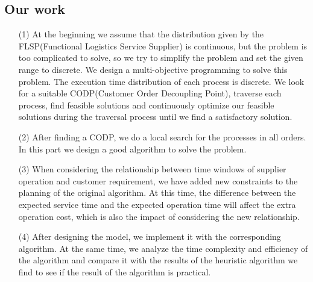 \documentclass{llncs}
\begin{document}
    \subsection{Our work}
    \begin{itemize}
        \item [(1)]At the beginning we assume that the distribution given by the FLSP(Functional Logistics Service Supplier) is continuous, but the problem is too complicated to solve, so we try to simplify the problem and set the given range to discrete. We design a multi-objective programming to solve this problem. The execution time distribution of each process is discrete. We look for a suitable CODP(Customer Order Decoupling Point), traverse each process, find feasible solutions and continuously optimize our feasible solutions during the traversal process until we find a satisfactory solution.
    
        \item[(2)]After finding a CODP, we do a local search for the processes in all orders. In this part we design a good algorithm to solve the problem.
    
        \item[(3)]When considering the relationship between time windows of supplier operation and customer requirement, we have added new constraints to the planning of the original algorithm. At this time, the difference between the expected service time and the expected operation time will affect the extra operation cost, which is also the impact of considering the new relationship.
    
        \item[(4)]After designing the model, we implement it with the corresponding algorithm. At the same time, we analyze the time complexity and efficiency of the algorithm and compare it with the results of the heuristic algorithm we find to see if the result of the algorithm is practical.
    
    \end{itemize}
    
\end{document}
